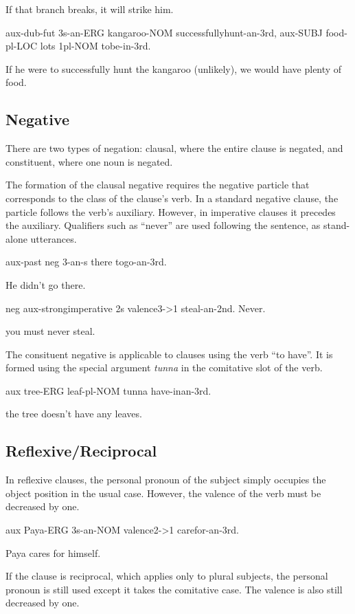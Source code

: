 If that branch breaks, it will strike him.

aux-dub-fut 3s-an-ERG kangaroo-NOM successfullyhunt-an-3rd, aux-SUBJ food-pl-LOC
lots 1pl-NOM tobe-in-3rd.

If he were to successfully hunt the kangaroo (unlikely), we would have plenty of
food.

\subsection{Negative}

There are two types of negation: clausal, where the entire clause is negated,
and constituent, where one noun is negated.

The formation of the clausal negative requires the negative particle that
corresponds to the class of the clause's verb. In a standard negative clause,
the particle follows the verb's auxiliary. However, in imperative clauses it
precedes the auxiliary. Qualifiers such as ``never'' are used following the
sentence, as stand-alone utterances.

aux-past neg 3-an-s there togo-an-3rd.

He didn't go there.

neg aux-strongimperative 2s valence3->1 steal-an-2nd. Never.

you must never steal.

The consituent negative is applicable to clauses using the verb ``to have''. It is
formed using the special argument \textit{tunna} in the comitative slot of the verb.

aux tree-ERG leaf-pl-NOM tunna have-inan-3rd.

the tree doesn't have any leaves.

\subsection{Reflexive/Reciprocal}

In reflexive clauses, the personal pronoun of the subject simply occupies the
object position in the usual case. However, the valence of the verb must be
decreased by one.

aux Paya-ERG 3s-an-NOM valence2->1 carefor-an-3rd.

Paya cares for himself.

If the clause is reciprocal, which applies only to plural subjects, the personal
pronoun is still used except it takes the comitative case. The valence is also
still decreased by one.

